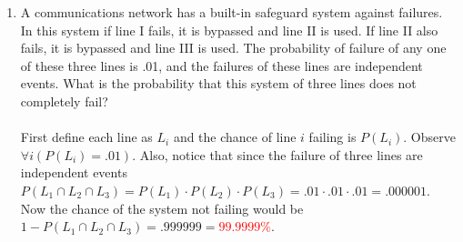 \documentclass{article}
\newcommand{\intersect}{\cap}
\begin{document}
\begin{enumerate}
            \item A communications network has a built-in safeguard system against failures. In this system if line I fails, it is bypassed and line II is used. If line II also fails, it is bypassed and line III is used. The probability of failure of any one of these three lines is .01, and the failures of these lines are independent events. What is the probability that this system of three lines does not completely fail?\\\\
            First define each line as $L_i$ and the chance of line $i$ failing is $P(L_i)$. Observe $\forall i(P(L_i)=.01)$. Also, notice that since the failure of three lines are independent events $P(L_1 \intersect L_2 \intersect L_3)=P(L_1) \cdot P(L_2) \cdot P(L_3) = .01 \cdot .01 \cdot .01 = .000001$. Now the chance of the system not failing would be $1-P(L_1 \intersect L_2 \intersect L_3) = .999999=$\textcolor{red}{$99.9999\%$}.
    \end{enumerate}
\end{document}
